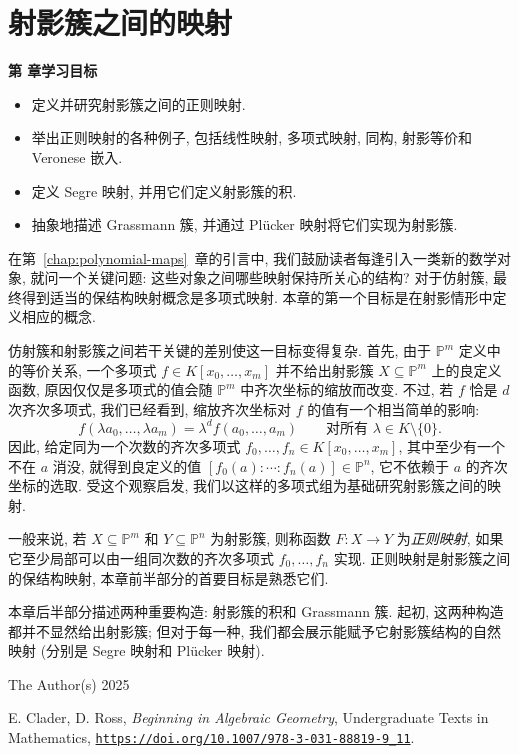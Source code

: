 \chapter{射影簇之间的映射}\label{chap:maps-of-projective-varieties}

\noindent\textbf{第 \thechapter{} 章学习目标}
\begin{itemize}
  \item 定义并研究射影簇之间的正则映射.
  \item 举出正则映射的各种例子, 包括线性映射, 多项式映射, 同构, 射影等价和 Veronese 嵌入.
  \item 定义 Segre 映射, 并用它们定义射影簇的积.
  \item 抽象地描述 Grassmann 簇, 并通过 Plücker 映射将它们实现为射影簇.
\end{itemize}

在第~\ref{chap:polynomial-maps}~章的引言中, 我们鼓励读者每逢引入一类新的数学对象, 就问一个关键问题: 这些对象之间哪些映射保持所关心的结构? 对于仿射簇, 最终得到适当的保结构映射概念是多项式映射. 本章的第一个目标是在射影情形中定义相应的概念.

仿射簇和射影簇之间若干关键的差别使这一目标变得复杂. 首先, 由于 $\mathbb{P}^{m}$ 定义中的等价关系, 一个多项式 $f\in K[x_{0},\ldots,x_{m}]$ 并不给出射影簇 $X\subseteq\mathbb{P}^{m}$ 上的良定义函数, 原因仅仅是多项式的值会随 $\mathbb{P}^{m}$ 中齐次坐标的缩放而改变. 不过, 若 $f$ 恰是 $d$ 次齐次多项式, 我们已经看到, 缩放齐次坐标对 $f$ 的值有一个相当简单的影响:
\[
  f(\lambda a_{0},\ldots,\lambda a_{m})=\lambda^{d}f(a_{0},\ldots,a_{m})
  \qquad\text{对所有 }\lambda\in K\setminus\{0\}.
\]
因此, 给定同为一个次数的齐次多项式 $f_{0},\ldots,f_{n}\in K[x_{0},\ldots,x_{m}]$, 其中至少有一个不在 $a$ 消没, 就得到良定义的值 $[f_{0}(a):\cdots:f_{n}(a)]\in\mathbb{P}^{n}$, 它不依赖于 $a$ 的齐次坐标的选取. 受这个观察启发, 我们以这样的多项式组为基础研究射影簇之间的映射.

一般来说, 若 $X\subseteq\mathbb{P}^{m}$ 和 $Y\subseteq\mathbb{P}^{n}$ 为射影簇, 则称函数 $F:X\to Y$ 为\emph{正则映射}, 如果它至少局部可以由一组同次数的齐次多项式 $f_{0},\ldots,f_{n}$ 实现. 正则映射是射影簇之间的保结构映射, 本章前半部分的首要目标是熟悉它们.

本章后半部分描述两种重要构造: 射影簇的积和 Grassmann 簇. 起初, 这两种构造都并不显然给出射影簇; 但对于每一种, 我们都会展示能赋予它射影簇结构的自然映射 (分别是 Segre 映射和 Plücker 映射).

\par\smallskip
{\footnotesize
\noindent\textcopyright{} The Author(s) 2025\par
\noindent E. Clader, D. Ross, \emph{Beginning in Algebraic Geometry}, Undergraduate Texts in Mathematics,
\href{https://doi.org/10.1007/978-3-031-88819-9_11}{\nolinkurl{https://doi.org/10.1007/978-3-031-88819-9_11}}.\par}

